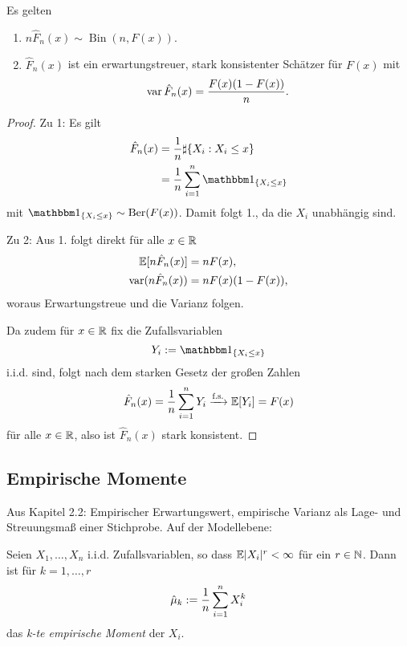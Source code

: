 \begin{thm}
  Es gelten
  \begin{enumerate}
  \item $n \hat{F}_n(x) \sim \operatorname{Bin}(n, F(x))$.
  \item $\hat{F}_n(x)$ ist ein erwartungstreuer, stark konsistenter Schätzer für
    $F(x)$ mit
    \[ \operatorname{var} \hat{F}_n(x) = \frac{F(x) (1 - F(x))}{n}. \]
  \end{enumerate}
\end{thm}

\begin{proof}
  Zu 1: Es gilt
  \begin{align*}
    \hat{F}_n(x)
    &= \rez{n} \sharp \{ X_i : X_i \le x\} \\
    &= \rez{n} \sum_{i=1}^n \ind_{\{X_i \le x\}}
  \end{align*}
  mit $\ind_{\{X_i \le x\}} \sim \operatorname{Ber}(F(x))$. Damit folgt 1., da
  die $X_i$ unabhängig sind.

  Zu 2: Aus 1. folgt direkt für alle $x \in \mathbb{R}$
  \begin{align*}
    \mathbb{E}[n \hat{F}_n(x) ] &= n F(x), \\
    \operatorname{var}(n \hat{F}_n(x)) &= n F(x) (1-F(x)),
  \end{align*}
  woraus Erwartungstreue und die Varianz folgen.

  Da zudem für $x \in \mathbb{R}$ fix die Zufallsvariablen
  \[ Y_i := \ind_{\{X_i \le x \}}\]
  i.i.d. sind, folgt nach dem starken Gesetz der großen Zahlen
  \[ \hat{F}_n(x) = \frac{1}{n} \sum_{i=1}^n Y_i \xrightarrow{\text{f.s.}} \mathbb{E}[Y_i]
    = F(x) \]
  für alle $x \in \mathbb{R}$, also ist $\hat{F}_n(x)$ stark konsistent.
\end{proof}

\subsection{Empirische Momente}
Aus Kapitel 2.2: Empirischer Erwartungswert, empirische Varianz als Lage- und
Streuungsmaß einer Stichprobe. Auf der Modellebene:

\begin{defn}
  Seien $X_1, \ldots, X_n$ i.i.d. Zufallsvariablen, so dass $\mathbb{E}|X_i|^r <
  \infty$ für ein $r \in \mathbb{N}$. Dann ist für $k = 1, \ldots, r$
  \begin{equation}
    \hat{\mu}_k := \frac{1}{n} \sum_{i=1}^n X_i^k
  \end{equation}
  das \emph{k-te empirische Moment} der $X_i$.
\end{defn}


